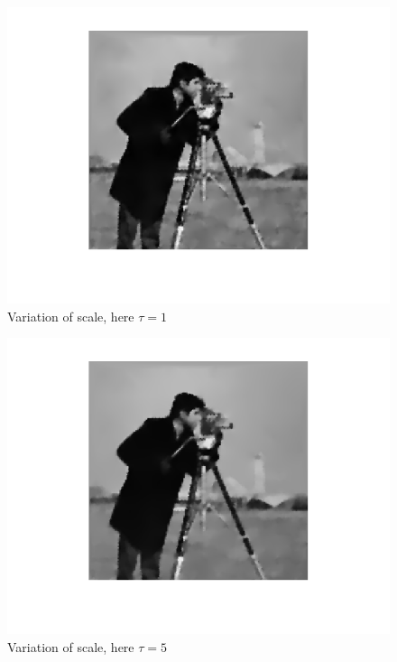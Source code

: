 \documentclass{report}
\begin{document}
\begin{figure}
	\centering
	\includegraphics[]{../out/report_taus03.png}
	\caption{Variation of scale, here $\tau = 1$}
	\label{vis:taus03}
\end{figure}

\begin{figure}
	\centering
	\includegraphics[]{../out/report_taus04.png}
	\caption{Variation of scale, here $\tau = 5$}
	\label{vis:taus04}
\end{figure}
\end{document}
